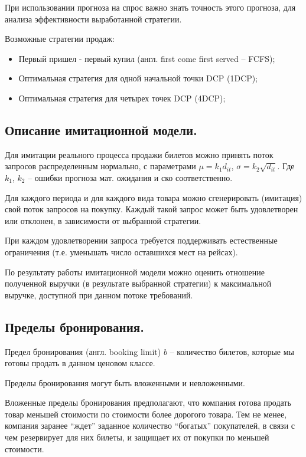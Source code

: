 \documentclass[reqno]{article}
\theoremstyle{definition}
\theoremstyle{definition}
\theoremstyle{definition}
\theoremstyle{definition}
\theoremstyle{definition}
\theoremstyle{definition}
\theoremstyle{definition}
\theoremstyle{definition}
\theoremstyle{definition}
\begin{document}
		При использовании прогноза на спрос важно знать точность этого прогноза, для анализа эффективности выработанной стратегии.
		
		Возможные стратегии продаж:
		\begin{itemize}
			\item Первый пришел - первый купил (англ. first come first served -- FCFS);
			\item Оптимальная стратегия для одной начальной точки DCP (1DCP);
			\item Оптимальная стратегия для четырех точек DCP (4DCP);
		\end{itemize}
	
	
		\subsection{Описание имитационной модели.}
		
		
		Для имитации реального процесса продажи билетов можно принять поток запросов распределенным нормально, с параметрами $\mu = k_1 d_{i t}$, $\sigma = k_2 \sqrt{d_{i t}}$. Где $k_1$, $k_2$ -- ошибки прогноза мат. ожидания и ско соответственно.
		
		Для каждого периода и для каждого вида товара можно сгенерировать (имитация) свой поток запросов на покупку. Каждый такой запрос может быть удовлетворен или отклонен, в зависимости от выбранной стратегии.
		
		При каждом удовлетворении запроса требуется поддерживать естественные ограничения (т.е. уменьшать число оставшихся мест на рейсах).
		
		По результату работы имитационной модели можно оценить отношение полученной выручки (в результате выбранной стратегии) к максимальной выручке, доступной при данном потоке требований.
		
		
		\subsection{Пределы бронирования.}
		
		Предел бронирования (англ. booking limit) $b$ -- количество билетов, которые мы готовы продать в данном ценовом классе.
		
		Пределы бронирования могут быть вложенными и невложенными.
		
		Вложенные пределы бронирования предполагают, что компания готова продать товар меньшей стоимости по стоимости более дорогого товара. Тем не менее, компания заранее ``ждет'' заданное количество ``богатых'' покупателей, в связи с чем резервирует для них билеты, и защищает их от покупки по меньшей стоимости.
		
\end{document}
